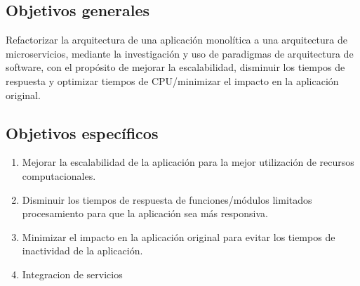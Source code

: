 
\subsection{Objetivos generales}
Refactorizar la arquitectura de una aplicación monolítica a una arquitectura de microservicios,
mediante la investigación y uso de paradigmas de arquitectura de software, con el propósito de
mejorar la escalabilidad, disminuir los tiempos de respuesta y optimizar tiempos de
CPU/minimizar el impacto en la aplicación original.

\subsection{Objetivos específicos}

\begin{enumerate}
  \item Mejorar la escalabilidad de la aplicación para la mejor utilización de recursos computacionales.
  \item Disminuir los tiempos de respuesta de funciones/módulos limitados procesamiento para que la aplicación sea más responsiva.
  \item Minimizar el impacto en la aplicación original para evitar los tiempos de inactividad de la aplicación.
  \item Integracion de servicios
\end{enumerate}

